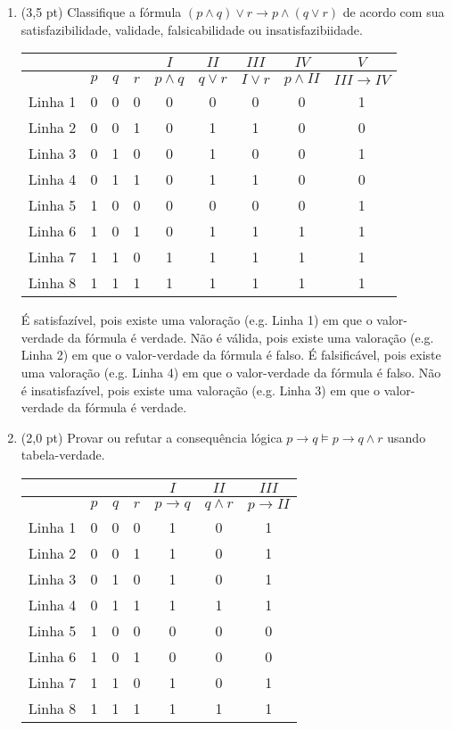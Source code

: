 \documentclass[11pt,a4paper,oneside]{article}
\begin{document}
\begin{enumerate}
	\item (3,5 pt) Classifique a fórmula $(p \wedge q) \vee r \rightarrow p \wedge (q \vee r)$ de acordo com sua satisfazibilidade, validade, falsicabilidade ou insatisfazibiidade.	\\
		{\color{verde}
			\begin{center}
				\begin{tabular}{c|ccc|c|c|c|c|c}
				& &  &  & $I$ & $II$ & $III$ & $IV$ & $V$ \\ 
				\hline 
				& $p$ & $q$ & $r$ & $p \wedge q$ & $q \vee r$ & $I \vee r$ & $p \wedge II$ & $III \rightarrow IV$\\ 
				\hline 
				Linha 1 & 0 & 0 & 0 & 0 & 0 & 0 & 0 & 1 \\ 
				Linha 2 & 0 & 0 & 1 & 0 & 1 & 1 & 0 & 0 \\ 
				Linha 3 & 0 & 1 & 0 & 0 & 1 & 0 & 0 & 1 \\ 
				Linha 4 & 0 & 1 & 1 & 0 & 1 & 1 & 0 & 0 \\ 
				Linha 5 & 1 & 0 & 0 & 0 & 0 & 0 & 0 & 1 \\ 
				Linha 6 & 1 & 0 & 1 & 0 & 1 & 1 & 1 & 1 \\ 
				Linha 7 & 1 & 1 & 0 & 1 & 1 & 1 & 1 & 1 \\ 
				Linha 8 & 1 & 1 & 1 & 1 & 1 & 1 & 1 & 1 \\ 
				\hline 
				\end{tabular}  
			\end{center} 
			
			É satisfazível, pois existe uma valoração (e.g. Linha 1) em que o valor-verdade da fórmula é verdade. Não é válida, pois existe uma valoração (e.g. Linha 2) em que o valor-verdade da fórmula é falso. É falsificável, pois existe uma valoração (e.g. Linha 4) em que o valor-verdade da fórmula é falso. Não é insatisfazível, pois existe uma valoração (e.g. Linha 3) em que o valor-verdade da fórmula é verdade.  
		}
	\item (2,0 pt) Provar ou refutar a consequência lógica $p \rightarrow q \models p \rightarrow q \wedge r$ usando tabela-verdade.\\
		{\color{verde}
			\begin{center}
				\begin{tabular}{c|ccc|c|c|c}
				& &  &  & $I$ & $II$ & $III$ \\ 
				\hline 
				& $p$ & $q$ & $r$ & $p \rightarrow q$ & $q \wedge r$ & $p \rightarrow II$ \\ 
				\hline 
				Linha 1 & 0 & 0 & 0 & 1 & 0 & 1 \\ 
				Linha 2 & 0 & 0 & 1 & 1 & 0 & 1 \\ 
				Linha 3 & 0 & 1 & 0 & 1 & 0 & 1 \\ 
				Linha 4 & 0 & 1 & 1 & 1 & 1 & 1 \\ 
				Linha 5 & 1 & 0 & 0 & 0 & 0 & 0 \\ 
				Linha 6 & 1 & 0 & 1 & 0 & 0 & 0 \\ 
				Linha 7 & 1 & 1 & 0 & 1 & 0 & 1 \\ 
				Linha 8 & 1 & 1 & 1 & 1 & 1 & 1 \\ 
				\hline 
				\end{tabular}  
			\end{center} 
			
}
\end{enumerate}
\end{document}
